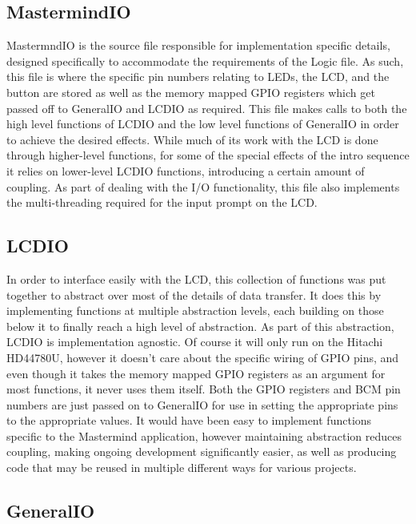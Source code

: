 \documentclass[a4paper, titlepage]{article}
\begin{document}
\subsection{MastermindIO}

MastermndIO is the source file responsible for implementation specific details, designed specifically to accommodate the requirements of the Logic file. As such, this file is where the specific pin numbers relating to LEDs, the LCD, and the button are stored as well as the memory mapped GPIO registers which get passed off to GeneralIO and LCDIO as required. This file makes calls to both the high level functions of LCDIO and the low level functions of GeneralIO in order to achieve the desired effects. While much of its work with the LCD is done through higher-level functions, for some of the special effects of the intro sequence it relies on lower-level LCDIO functions, introducing a certain amount of coupling. As part of dealing with the I/O functionality, this file also implements the multi-threading required for the input prompt on the LCD.

\subsection{LCDIO}

In order to interface easily with the LCD, this collection of functions was put together to abstract over most of the details of data transfer. It does this by implementing functions at multiple abstraction levels, each building on those below it to finally reach a high level of abstraction. As part of this abstraction, LCDIO is implementation agnostic. Of course it will only run on the Hitachi HD44780U, however it doesn't care about the specific wiring of GPIO pins, and even though it takes the memory mapped GPIO registers as an argument for most functions, it never uses them itself. Both the GPIO registers and BCM pin numbers are just passed on to GeneralIO for use in setting the appropriate pins to the appropriate values. It would have been easy to implement functions specific to the Mastermind application, however maintaining abstraction reduces coupling, making  ongoing development significantly easier, as well as producing code that may be reused in multiple different ways for various projects. 

\subsection{GeneralIO}
\end{document}
